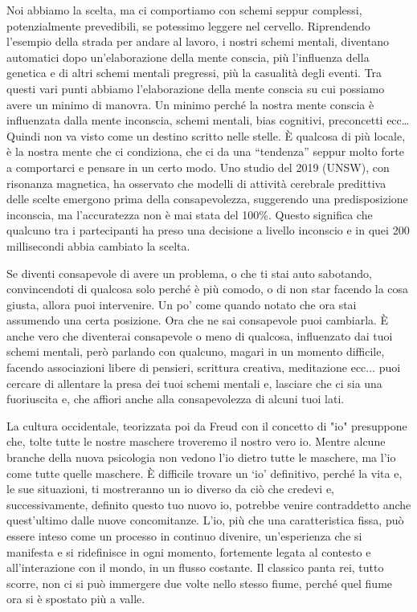 \documentclass[12pt]{book} %
\begin{document}
Noi abbiamo la scelta, ma ci comportiamo con schemi seppur complessi, potenzialmente prevedibili, se potessimo leggere
nel cervello. Riprendendo l'esempio della strada per andare al lavoro, i nostri schemi mentali,
diventano automatici dopo un'elaborazione della mente conscia, più
l'influenza della genetica e di altri schemi mentali pregressi, più la casualità degli eventi. Tra questi vari punti abbiamo l'elaborazione della mente conscia su cui possiamo avere un minimo di manovra. Un minimo perché la nostra mente conscia è influenzata dalla mente inconscia, schemi mentali, bias
cognitivi, preconcetti ecc… Quindi non va visto come un destino scritto nelle stelle. È qualcosa di più locale, è la
nostra mente che ci condiziona, che ci da una “tendenza” seppur molto forte a comportarci e pensare in un certo modo.
Uno studio del 2019 (UNSW), con risonanza magnetica, ha osservato che modelli di attività cerebrale predittiva delle scelte emergono prima della consapevolezza, suggerendo una predisposizione inconscia, ma l’accuratezza non è mai stata del 100\%.
Questo significa che qualcuno tra i partecipanti ha preso
una decisione a livello inconscio e in quei 200 millisecondi abbia cambiato la
scelta.

Se diventi consapevole di avere un problema, o che ti stai auto sabotando,
convincendoti di qualcosa solo perché è più comodo, o di non star facendo la cosa giusta, allora puoi intervenire.
Un po' come quando notato che ora stai assumendo una certa posizione. Ora che ne sai consapevole puoi
cambiarla. È anche vero che diventerai consapevole o meno di qualcosa, influenzato dai tuoi schemi mentali,
però parlando con qualcuno, magari in un momento difficile, facendo associazioni libere di pensieri, scrittura
creativa, meditazione ecc... puoi cercare di allentare la presa dei tuoi schemi mentali e,
lasciare che ci sia una fuoriuscita e, che affiori anche alla consapevolezza di alcuni tuoi lati.

La cultura occidentale, teorizzata poi da Freud con il concetto di "io" presuppone che,
tolte tutte le nostre maschere troveremo il nostro vero io. Mentre alcune branche della nuova psicologia non vedono
l'io dietro tutte le maschere, ma l'io come tutte quelle maschere. È difficile trovare un ‘io’ definitivo, perché la vita e, le sue
situazioni, ti mostreranno un io diverso da ciò che credevi e, successivamente, definito questo tuo nuovo io, potrebbe venire
contraddetto anche quest'ultimo dalle nuove concomitanze. L'io, più che una caratteristica fissa, può essere inteso come un processo in continuo divenire, un'esperienza che si manifesta e si ridefinisce in ogni momento, fortemente legata al contesto e all'interazione con il mondo, in un flusso costante. Il classico panta rei, tutto scorre, non ci si può immergere due volte nello stesso fiume, perché quel fiume
ora si è spostato più a valle.
\end{document}
